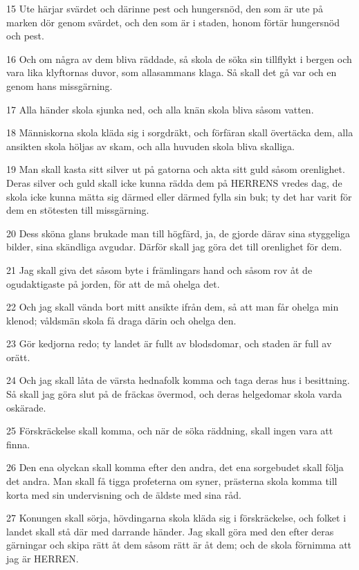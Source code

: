 \par 15 Ute härjar svärdet och därinne pest och hungersnöd, den som är ute på marken dör genom svärdet, och den som är i staden, honom förtär hungersnöd och pest.
\par 16 Och om några av dem bliva räddade, så skola de söka sin tillflykt i bergen och vara lika klyftornas duvor, som allasammans klaga. Så skall det gå var och en genom hans missgärning.
\par 17 Alla händer skola sjunka ned, och alla knän skola bliva såsom vatten.
\par 18 Människorna skola kläda sig i sorgdräkt, och förfäran skall övertäcka dem, alla ansikten skola höljas av skam, och alla huvuden skola bliva skalliga.
\par 19 Man skall kasta sitt silver ut på gatorna och akta sitt guld såsom orenlighet. Deras silver och guld skall icke kunna rädda dem på HERRENS vredes dag, de skola icke kunna mätta sig därmed eller därmed fylla sin buk; ty det har varit för dem en stötesten till missgärning.
\par 20 Dess sköna glans brukade man till högfärd, ja, de gjorde därav sina styggeliga bilder, sina skändliga avgudar. Därför skall jag göra det till orenlighet för dem.
\par 21 Jag skall giva det såsom byte i främlingars hand och såsom rov åt de ogudaktigaste på jorden, för att de må ohelga det.
\par 22 Och jag skall vända bort mitt ansikte ifrån dem, så att man får ohelga min klenod; våldsmän skola få draga därin och ohelga den.
\par 23 Gör kedjorna redo; ty landet är fullt av blodsdomar, och staden är full av orätt.
\par 24 Och jag skall låta de värsta hednafolk komma och taga deras hus i besittning. Så skall jag göra slut på de fräckas övermod, och deras helgedomar skola varda oskärade.
\par 25 Förskräckelse skall komma, och när de söka räddning, skall ingen vara att finna.
\par 26 Den ena olyckan skall komma efter den andra, det ena sorgebudet skall följa det andra. Man skall få tigga profeterna om syner, prästerna skola komma till korta med sin undervisning och de äldste med sina råd.
\par 27 Konungen skall sörja, hövdingarna skola kläda sig i förskräckelse, och folket i landet skall stå där med darrande händer. Jag skall göra med den efter deras gärningar och skipa rätt åt dem såsom rätt är åt dem; och de skola förnimma att jag är HERREN.

